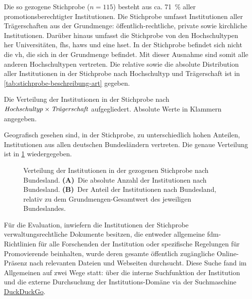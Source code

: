 Die so gezogene Stichprobe ($n=115$) besteht aus ca. \SI{71}{\percent} aller promotionsberechtigter Institutionen.
Die Stichprobe umfasst Institutionen aller Trägerschaften aus der Grundmenge: öffentlich-rechtliche, private sowie kirchliche Institutionen.
Darüber hinaus umfasst die Stichprobe von den Hochschultypen her Universitäten, \glspl{fh}, \glspl{haw} und eine \gls{hset}.
In der Stichprobe befindet sich nicht die \gls{vh}, die sich in der Grundmenge befindet.
Mit dieser Ausnahme sind somit alle anderen Hochschultypen vertreten.
Die relative sowie die absolute Distribution aller Institutionen in der Stichprobe nach Hochschultyp und Trägerschaft ist in \cref{tab:stichprobe-beschreibung-art} gegeben.
\begin{table}[!htbp]
	\caption{Die Verteilung der Institutionen in der Stichprobe nach $\text{\textit{Hochschultyp}}\times\text{\textit{Trägerschaft}}$ aufgegliedert. Absolute Werte in Klammern angegeben.}
    
	\label{tab:stichprobe-beschreibung-art}
\end{table}

\noindent Geografisch gesehen sind, in der Stichprobe, zu unterschiedlich hohen Anteilen, Institutionen aus allen deutschen Bundesländern vertreten.
Die genaue Verteilung ist in \cref{fig:DE-stichprobe-beschreibung} wiedergegeben.
\begin{figure}[!htbp]
    \centering
    
    \caption{Verteilung der Institutionen in der gezogenen Stichprobe nach Bundesland. \textbf{(A)}~Die absolute Anzahl der Institutionen nach Bundesland. \textbf{(B)}~Der Anteil der Institutionen nach Bundesland, relativ zu dem Grundmengen-Gesamtwert des jeweiligen Bundeslandes.}
    \label{fig:DE-stichprobe-beschreibung}
\end{figure}

Für die Evaluation, inwiefern die Institutionen der Stichprobe verwaltungsrechtliche Dokumente besitzen, die entweder allgemeine \gls{fdm}-Richtlinien für alle Forschenden der Institution oder spezifische Regelungen für Promovierende beinhalten, wurde deren gesamte öffentlich zugängliche Online-Präsenz nach relevanten Dateien und Webseiten durchsucht.
Diese Suche fand im Allgemeinen auf zwei Wege statt: über die interne Suchfunktion der Institution und die externe Durchsuchung der Institutions-Domäne via der Suchmaschine \href{https://www.duckduckgo.com/}{DuckDuckGo}.

